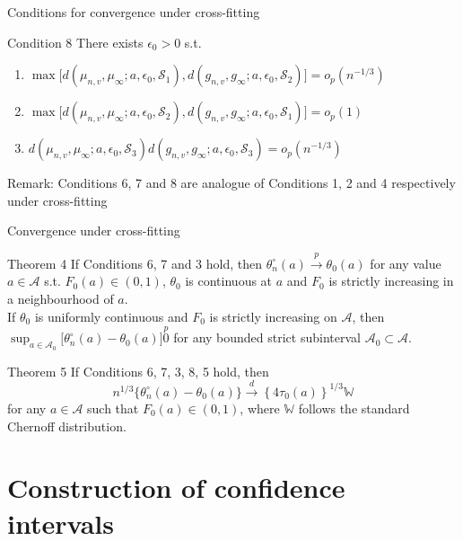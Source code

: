 \documentclass{beamer}
\newcommand{\vs}[1]{\vspace{#1 cm}}
\begin{document}
\begin{frame}{Conditions for convergence under cross-fitting}
  \begin{block}{Condition 8}
    There exists $\epsilon_0 > 0$ s.t.
    \begin{enumerate}
      \item $\max \big[ d(\mu_{n,v},\mu_\infty; a,\epsilon_0,\mathcal{S}_1), d(g_{n,v},g_\infty; a,\epsilon_0,\mathcal{S}_2) \big] = o_p(n^{-1/3})$
      \item $\max \big[ d(\mu_{n,v},\mu_\infty; a,\epsilon_0,\mathcal{S}_2), d(g_{n,v},g_\infty; a,\epsilon_0,\mathcal{S}_1) \big] = o_p(1)$
      \item $d(\mu_{n,v},\mu_\infty; a,\epsilon_0,\mathcal{S}_3) d(g_{n,v},g_\infty; a,\epsilon_0,\mathcal{S}_3) = o_p(n^{-1/3})$
    \end{enumerate}
  \end{block}
  Remark: Conditions 6, 7 and 8 are analogue of Conditions 1, 2 and 4 respectively under cross-fitting
\end{frame}

\begin{frame}{Convergence under cross-fitting}
  \begin{block}{Theorem 4}
    If Conditions 6, 7 and 3 hold, then $\theta_n^\circ(a) \stackrel{p}{\rightarrow} \theta_0(a)$ for any value $a \in \mathcal{A}$ s.t. $F_0(a) \in (0,1)$, $\theta_0$ is continuous at $a$ and $F_0$ is strictly increasing in a neighbourhood of $a$. \\
    \vs{0.3}
    If $\theta_0$ is uniformly continuous and $F_0$ is strictly increasing on $\mathcal{A}$, then $\sup_{a \in \mathcal{A}_0} \big[ \theta_n^\circ(a) -\theta_0(a) \big] \stackrel{p} 0$ for any bounded strict subinterval $\mathcal{A}_0 \subset \mathcal{A}$.
  \end{block}
  \begin{block}{Theorem 5}
    If Conditions 6, 7, 3, 8, 5 hold, then
    $$
      n^{1/3} \{ \theta_n^\circ(a) -\theta_0(a) \} \stackrel{d}{\rightarrow} \left\{ 4 \tau_0(a) \right\}^{1/3} \mathbb{W}
    $$
    for any $a \in \mathcal{A}$ such that $F_0(a) \in (0,1)$, where $\mathbb{W}$ follows the standard Chernoff distribution.
  \end{block}
\end{frame}

\section{Construction of confidence intervals}
\end{document}

